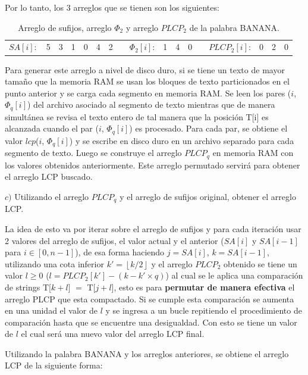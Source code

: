 \newpage

Por lo tanto, los 3 arreglos que se tienen son los siguientes:

\begin{table}[h]
\centering
\begin{tabular}{c|c|c|c|c|c|c|cc|c|c|c|ll|l|l|l|}
\cline{2-7} \cline{10-12} \cline{15-17}
$SA[i]:$ & 5 & 3 & 1 & 0 & 4 & 2 &  & $\Phi_{2}[i]$: & 1 & 4 & 0 &  & $PLCP_{2}[i]$: & 0 & 2 & 0 \\ \cline{2-7} \cline{10-12} \cline{15-17} 
\end{tabular}
\caption{Arreglo de sufijos, arreglo $\Phi_{2}$ y arreglo $PLCP_{2}$ de la palabra BANANA.}
\end{table}

Para generar este arreglo a nivel de disco duro, si se tiene un texto de mayor tamaño que la memoria RAM se usan los bloques de texto particionados en el punto anterior y se carga cada segmento en memoria RAM. Se leen los pares ($i$, $\Phi_{q}[i]$) del archivo asociado al segmento de texto mientras que de manera simultánea se revisa el texto entero de tal manera que la posición T[i] es alcanzada cuando el par ($i$, $\Phi_{q}[i]$) es procesado. Para cada par, se obtiene el valor $lcp$($i$, $\Phi_{q}[i]$) y se escribe en disco duro en un archivo separado para cada segmento de texto. Luego se construye el arreglo $PLCP_{q}$ en memoria RAM con los valores obtenidos anteriormente. Este arreglo permutado servirá para obtener el arreglo LCP buscado.

$c)$ Utilizando el arreglo $PLCP_{q}$ y el arreglo de sufijos original, obtener el arreglo LCP.

La idea de esto va por iterar sobre el arreglo de sufijos y para cada iteración usar 2 valores del arreglo de sufijos, el valor actual y el anterior ($SA[i]$ y $SA[i-1]$ para $i \in [0,n-1]$), de esa forma haciendo $j = SA[i]$, $k = SA[i-1]$, utilizando una cota inferior $k' = \left \lfloor{k/2}\right \rfloor$ y el arreglo $PLCP_{2}$ obtenido se tiene un valor $l \geq 0$ ($l=PLCP_{2}[k']-(k-k' \times q)$) al cual se le aplica una comparación de strings T[$k+l$] $=$ T[$j+l$], esto es para \textbf{permutar de manera efectiva} el arreglo PLCP que esta compactado. Si se cumple esta comparación se aumenta en una unidad el valor de $l$ y se ingresa a un bucle repitiendo el procedimiento de comparación hasta que se encuentre una desigualdad. Con esto se tiene un valor de $l$ el cual será una nuevo valor del arreglo LCP final.

Utilizando la palabra BANANA y los arreglos anteriores, se obtiene el arreglo LCP de la siguiente forma:

